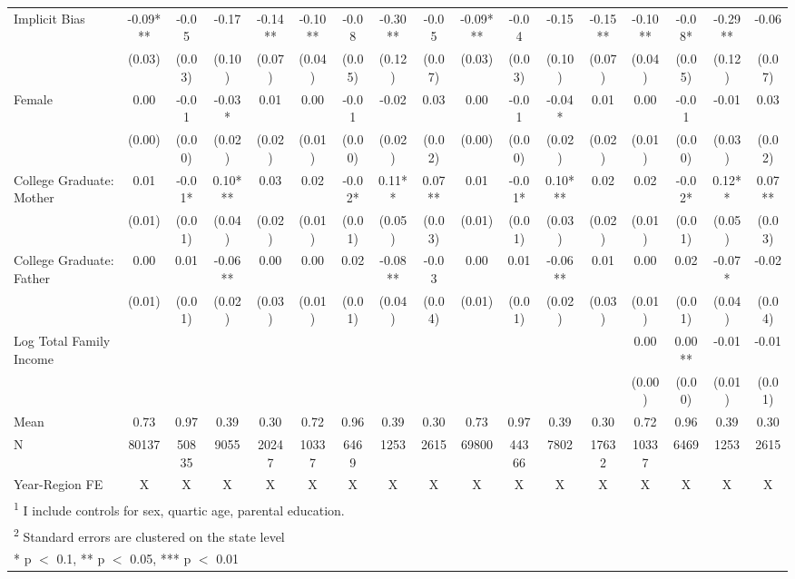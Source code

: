 \begin{table}[!h]
{\begin{tabular}[t]{lcccccccccccccccc}
\midrule
Implicit Bias & -0.09*** & -0.05 & -0.17 & -0.14** & -0.10** & -0.08 & -0.30** & -0.05 & -0.09*** & -0.04 & -0.15 & -0.15** & -0.10** & -0.08* & -0.29** & -0.06\\
 & (0.03) & (0.03) & (0.10) & (0.07) & (0.04) & (0.05) & (0.12) & (0.07) & (0.03) & (0.03) & (0.10) & (0.07) & (0.04) & (0.05) & (0.12) & (0.07)\\
Female & 0.00 & -0.01 & -0.03* & 0.01 & 0.00 & -0.01 & -0.02 & 0.03 & 0.00 & -0.01 & -0.04* & 0.01 & 0.00 & -0.01 & -0.01 & 0.03\\
 & (0.00) & (0.00) & (0.02) & (0.02) & (0.01) & (0.00) & (0.02) & (0.02) & (0.00) & (0.00) & (0.02) & (0.02) & (0.01) & (0.00) & (0.03) & (0.02)\\
College Graduate: Mother & 0.01 & -0.01* & 0.10*** & 0.03 & 0.02 & -0.02* & 0.11** & 0.07** & 0.01 & -0.01* & 0.10*** & 0.02 & 0.02 & -0.02* & 0.12** & 0.07**\\
 & (0.01) & (0.01) & (0.04) & (0.02) & (0.01) & (0.01) & (0.05) & (0.03) & (0.01) & (0.01) & (0.03) & (0.02) & (0.01) & (0.01) & (0.05) & (0.03)\\
College Graduate: Father & 0.00 & 0.01 & -0.06** & 0.00 & 0.00 & 0.02 & -0.08** & -0.03 & 0.00 & 0.01 & -0.06** & 0.01 & 0.00 & 0.02 & -0.07* & -0.02\\
 & (0.01) & (0.01) & (0.02) & (0.03) & (0.01) & (0.01) & (0.04) & (0.04) & (0.01) & (0.01) & (0.02) & (0.03) & (0.01) & (0.01) & (0.04) & (0.04)\\
Log Total Family Income &  &  &  &  &  &  &  &  &  &  &  &  & 0.00 & 0.00** & -0.01 & -0.01\\
 &  &  &  &  &  &  &  &  &  &  &  &  & (0.00) & (0.00) & (0.01) & (0.01)\\
\midrule
Mean & 0.73 & 0.97 & 0.39 & 0.30 & 0.72 & 0.96 & 0.39 & 0.30 & 0.73 & 0.97 & 0.39 & 0.30 & 0.72 & 0.96 & 0.39 & 0.30\\
N & 80137 & 50835 & 9055 & 20247 & 10337 & 6469 & 1253 & 2615 & 69800 & 44366 & 7802 & 17632 & 10337 & 6469 & 1253 & 2615\\
Year-Region FE & X & X & X & X & X & X & X & X & X & X & X & X & X & X & X & X\\
\bottomrule
\multicolumn{17}{l}{\rule{0pt}{1em}\textsuperscript{1} I include controls for sex, quartic age, parental education.}\\
\multicolumn{17}{l}{\rule{0pt}{1em}\textsuperscript{2} Standard errors are clustered on the state level}\\
\multicolumn{17}{l}{\rule{0pt}{1em}* p $<$ 0.1, ** p $<$ 0.05, *** p $<$ 0.01}\\
\end{tabular}}
\end{table}

